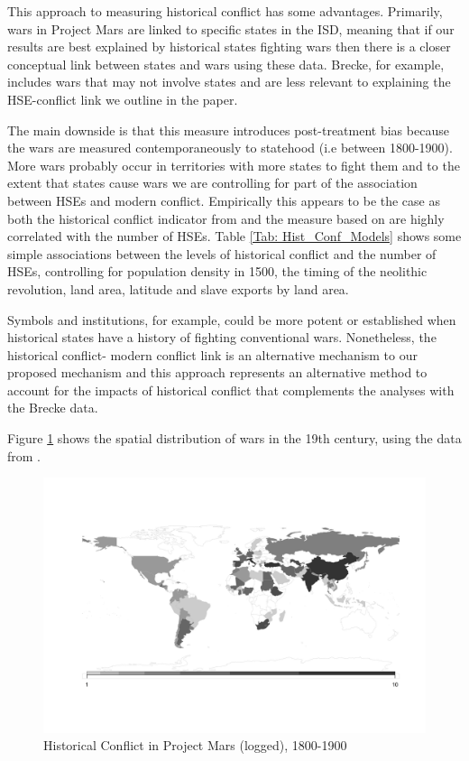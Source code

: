 \documentclass[12pt]{article}
\begin{document}
This approach to measuring historical conflict has some advantages. Primarily, wars in Project Mars are linked to specific states in the ISD, meaning that if our results are best explained by historical states fighting wars then there is a closer conceptual link between states and wars using these data. Brecke, for example, includes wars that may not involve states and are less relevant to explaining the HSE-conflict link we outline in the paper. 

The main downside is that this measure introduces post-treatment bias because the wars are measured contemporaneously to statehood (i.e between 1800-1900). More wars probably occur in territories with more states to fight them and to the extent that states cause wars we are controlling for part of the association between HSEs and modern conflict. Empirically this appears to be the case as both the historical conflict indicator from \citet{Dincecco2019} and the measure based on \citet{Lyall2020} are highly correlated with the number of HSEs. Table \ref{Tab: Hist_Conf_Models} shows some simple associations between the levels of historical conflict and the number of HSEs, controlling for population density in 1500, the timing of the neolithic revolution, land area, latitude and slave exports by land area. 

     

Symbols and institutions, for example, could be more potent or established when historical states have a history of fighting conventional wars. Nonetheless, the historical conflict- modern conflict link is an alternative mechanism to our proposed mechanism and this approach represents an alternative method to account for the impacts of historical conflict that complements the analyses with the Brecke data. 

Figure \ref{Fig: Mars_Map} shows the spatial distribution of wars in the 19th century, using the data from \citet{Lyall2020}. 

   \begin{figure}[H] \hspace{-0,5cm} 
   \includegraphics[width=\textwidth,
    height=\textheight, keepaspectratio]{img/historical_conflict_pm_map.png} \caption{Historical Conflict in Project Mars (logged), 1800-1900} \label{Fig: Mars_Map} \end{figure}
\end{document}
